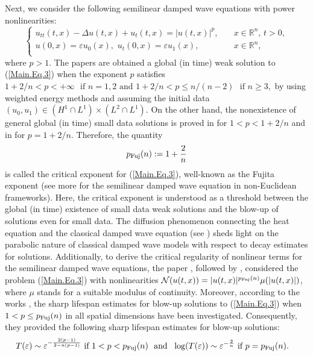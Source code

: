 \documentclass[11pt,reqno]{amsart}
\newcommand{\R}{\mathbb{R}}
\begin{document}
Next, we consider the following semilinear damped wave equations with power nonlinearities:
\begin{equation} \label{Main.Eq.3}
\begin{cases}
u_{tt}(t,x) -\Delta u (t,x) + u_t(t,x)= |u(t,x)|^p, &\quad x\in \R^n,\, t > 0, \\
u(0,x)= \varepsilon u_0(x), \,\, u_t(0,x) = \varepsilon u_1(x), &\quad x \in \mathbb{R}^n, \\
\end{cases}
\end{equation}
where $p > 1$. The papers \cite{TodorovaYordanov2001, IkehataMiyaokaNakatake2004, IkehataTanizawa2005} are obtained a global (in time) weak solution to (\ref{Main.Eq.3}) when the exponent $p$ satisfies
  $
          1+ 2/n < p < +\infty \,\,\text{ if } n = 1,2 \text{ and }
          1 +2/n < p \leq n/(n-2) \,\,\text{ if } n \geq 3,
 $
  by using weighted
  energy methods and assuming the initial data $(u_0,u_1) \in (H^1 \cap L^1)\times (L^2 \cap L^1).$ On the other hand, the nonexistence of general global (in time) small data solutions is proved in \cite{TodorovaYordanov2001} for $1 < p < 1 +2/n$ and in \cite{Zhang2001} for $p = 1+2/n$. Therefore, the quantity
  $$p_{\rm Fuj}(n) := 1+\frac{2}{n} $$ 
 is called the critical exponent for (\ref{Main.Eq.3}), well-known as the Fujita exponent (see more \cite{Palmieri2020, Palmieri2021, GeogievPalmieri2020} for the semilinear damped wave equation in non-Euclidean frameworks). 
Here, the critical exponent is understood as a threshold
between the global (in time) existence of small data weak solutions and the blow-up of solutions even for small data. The diffusion phenomenon connecting the heat equation and the classical damped wave equation (see \cite{Narazaki2004, Nishihara2003}) sheds light on the parabolic nature of classical damped wave models with respect to decay estimates for solutions. Additionally, to derive the critical regularity of nonlinear terms for the semilinear damped wave equations, the paper \cite{Ebert2020}, followed by \cite{Girardi2025,TangDuong2026}, considered the problem (\ref{Main.Eq.3}) with
nonlinearities $\mathcal{N}(u(t,x)) = |u(t,x)|^{p_{\rm Fuj}(n)}\mu(|u(t,x)|)$, where $\mu$ stands for a suitable
modulus of continuity. Moreover, according to the works \cite{LiZhou1995, IkedaOgawa2016, LaiZhou2019}, the sharp lifespan estimates for blow-up solutions to (\ref{Main.Eq.3}) when $1< p \leq p_{\rm Fuj}(n)$ in all spatial dimensions have been investigated. Consequently, they provided the following sharp lifespan estimates for blow-up solutions:
\begin{align*}
    T(\varepsilon) \sim
    \varepsilon^{-\frac{2(p-1)}{2-n(p-1)}} \text{ if } 1 < p < p_{\rm Fuj}(n) \,\,\text{ and } \,\,\log(T(\varepsilon)) \sim 
        \varepsilon^{-\frac{2}{n}} &\text{ if } p = p_{\rm Fuj}(n). 
\end{align*}
\end{document}
